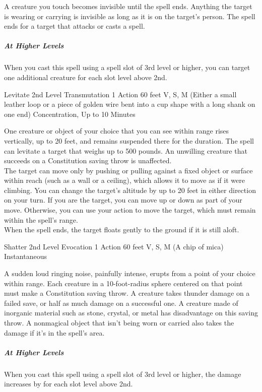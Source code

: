 \documentclass[letterpaper,openany,oneside,twocolumn]{book}
\begin{document}
A creature you touch becomes invisible until the spell ends. Anything the target is wearing or carrying is invisible as long as it is on the target's person. The spell ends for a target that attacks or casts a spell.

\subparagraph*{At Higher Levels} When you cast this spell using a spell slot of 3rd level or higher, you can target one additional creature for each slot level above 2nd.

\DndSpellHeader
  {Levitate}
  {2nd Level Transmutation}
  {1 Action}
  {60 feet}
  {V, S, M (Either a small leather loop or a piece of golden wire bent into a cup shape with a long shank on one end)}
  {Concentration, Up to 10 Minutes}
  
One creature or object of your choice that you can see within range rises vertically, up to 20 feet, and remains suspended there for the duration. The spell can levitate a target that weighs up to 500 pounds. An unwilling creature that succeeds on a Constitution saving throw is unaffected.\\
The target can move only by pushing or pulling against a fixed object or surface within reach (such as a wall or a ceiling), which allows it to move as if it were climbing. You can change the target's altitude by up to 20 feet in either direction on your turn. If you are the target, you can move up or down as part of your move. Otherwise, you can use your action to move the target, which must remain within the spell's range.\\
When the spell ends, the target floats gently to the ground if it is still aloft.

\DndSpellHeader
  {Shatter}
  {2nd Level Evocation}
  {1 Action}
  {60 feet}
  {V, S, M (A chip of mica)}
  {Instantaneous}

A sudden loud ringing noise, painfully intense, erupts from a point of your choice within range. Each creature in a 10-foot-radius sphere centered on that point must make a Constitution saving throw. A creature takes  thunder damage on a failed save, or half as much damage on a successful one. A creature made of inorganic material such as stone, crystal, or metal has disadvantage on this saving throw. A nonmagical object that isn't being worn or carried also takes the damage if it's in the spell's area.

\subparagraph*{At Higher Levels} When you cast this spell using a spell slot of 3rd level or higher, the damage increases by  for each slot level above 2nd.
\end{document}
